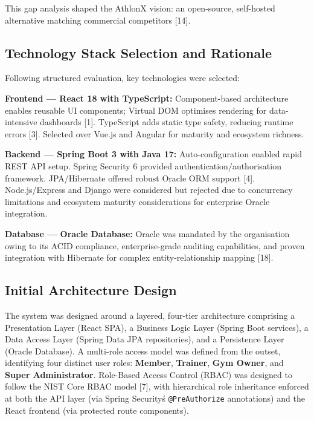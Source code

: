 \documentclass[
  12pt,
  a4paperpaper,
]{report}
\begin{document}
This gap analysis shaped the AthlonX vision: an open-source, self-hosted alternative matching commercial competitors [14].

\subsection{Technology Stack Selection and
Rationale}\label{technology-stack-rationale}

Following structured evaluation, key technologies were selected:

\textbf{Frontend --- React 18 with TypeScript:} Component-based architecture enables reusable UI components; Virtual DOM optimises rendering for data-intensive dashboards [1]. TypeScript adds static type safety, reducing runtime errors [3]. Selected over Vue.js and Angular for maturity and ecosystem richness.

\textbf{Backend --- Spring Boot 3 with Java 17:} Auto-configuration enabled rapid REST API setup. Spring Security 6 provided authentication/authorisation framework.
JPA/Hibernate offered robust Oracle ORM support {[}4{]}.
Node.js/Express and Django were considered but rejected due to
concurrency limitations and ecosystem maturity considerations for
enterprise Oracle integration.

\textbf{Database --- Oracle Database:} Oracle was mandated by the
organisation owing to its ACID compliance, enterprise-grade auditing
capabilities, and proven integration with Hibernate for complex
entity-relationship mapping {[}18{]}.

\subsection{Initial Architecture Design}\label{initial-architecture-design}

The system was designed around a layered, four-tier architecture
comprising a Presentation Layer (React SPA), a Business Logic Layer
(Spring Boot services), a Data Access Layer (Spring Data JPA
repositories), and a Persistence Layer (Oracle Database). A
multi-role access model was defined from the outset, identifying four
distinct user roles: \textbf{Member}, \textbf{Trainer},
\textbf{Gym Owner}, and \textbf{Super Administrator}. Role-Based
Access Control (RBAC) was designed to follow the NIST Core RBAC
model {[}7{]}, with hierarchical role inheritance
enforced at both the API layer (via Spring Security\'s
\texttt{@PreAuthorize} annotations) and the React frontend (via
protected route components).
\end{document}
